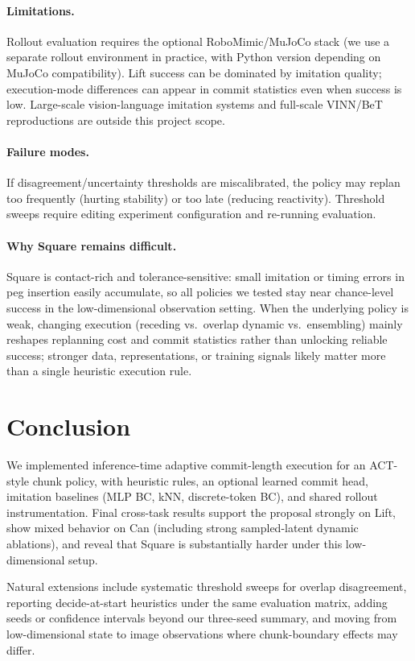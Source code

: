 \documentclass{article}
\begin{document}
\paragraph{Limitations.} Rollout evaluation requires the optional RoboMimic/MuJoCo stack (we use a separate rollout environment in practice, with Python version depending on MuJoCo compatibility). Lift success can be dominated by imitation quality; execution-mode differences can appear in commit statistics even when success is low. Large-scale vision-language imitation systems and full-scale VINN/BeT reproductions are outside this project scope.

\paragraph{Failure modes.} If disagreement/uncertainty thresholds are miscalibrated, the policy may replan too frequently (hurting stability) or too late (reducing reactivity). Threshold sweeps require editing experiment configuration and re-running evaluation.

\paragraph{Why Square remains difficult.} Square is contact-rich and tolerance-sensitive: small imitation or timing errors in peg insertion easily accumulate, so all policies we tested stay near chance-level success in the low-dimensional observation setting. When the underlying policy is weak, changing execution (receding vs.\ overlap dynamic vs.\ ensembling) mainly reshapes replanning cost and commit statistics rather than unlocking reliable success; stronger data, representations, or training signals likely matter more than a single heuristic execution rule.

\section{Conclusion}
We implemented inference-time adaptive commit-length execution for an ACT-style chunk policy, with heuristic rules, an optional learned commit head, imitation baselines (MLP BC, kNN, discrete-token BC), and shared rollout instrumentation. Final cross-task results support the proposal strongly on Lift, show mixed behavior on Can (including strong sampled-latent dynamic ablations), and reveal that Square is substantially harder under this low-dimensional setup.

Natural extensions include systematic threshold sweeps for overlap disagreement, reporting decide-at-start heuristics under the same evaluation matrix, adding seeds or confidence intervals beyond our three-seed summary, and moving from low-dimensional state to image observations where chunk-boundary effects may differ.
\end{document}
